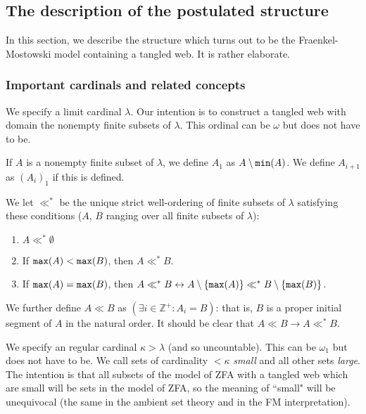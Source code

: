 \documentclass[12pt]{article}
\begin{document}
\subsection{The description of the postulated structure}

In this section, we describe the structure which turns out to be the Fraenkel-Mostowski model containing a tangled web.  It is rather elaborate.

\newpage

\subsubsection{Important cardinals and related concepts}

We specify a limit cardinal $\lambda$.  Our intention is to construct a tangled web with domain the nonempty finite subsets of $\lambda$.  This ordinal can be $\omega$ but does not have to be.

If $A$ is a nonempty finite subset of $\lambda$, we define $A_1$ as $A \setminus {\tt min}(A)$.  We define $A_{i+1}$ as $(A_i)_1$ if this is defined.

We let $\ll^*$ be the unique strict well-ordering of finite subsets of $\lambda$ satisfying these conditions ($A$, $B$ ranging over all finite subsets of $\lambda$):

\begin{enumerate}

\item  $A \ll^* \emptyset$

\item  If ${\tt max}(A) < {\tt max}(B)$, then $A \ll^* B$.

\item  If ${\tt max}(A) = {\tt max}(B)$, then $A \ll^* B \leftrightarrow A \setminus \{{\tt max}(A)\} \ll^* B \setminus \{{\tt max}(B)\}$.

\end{enumerate}

We further define $A \ll B$ as $(\exists i \in {\mathbb Z}^+:A_i = B)$:  that is, $B$ is a proper initial segment of $A$ in the natural order.  It should be clear
that $A \ll B \rightarrow A \ll^* B$.

We specify an regular cardinal $\kappa>\lambda$ (and so uncountable).  This can be $\omega_1$ but does not have to be.  We call sets of cardinality $<\kappa$ {\em small\/} and all other sets
{\em large}.  The intention is that all subsets of the model of ZFA with a tangled web which are small will be sets in the model of ZFA, so the meaning of ``small" will be unequivocal (the same in the ambient set theory and in the FM interpretation).
\end{document}
